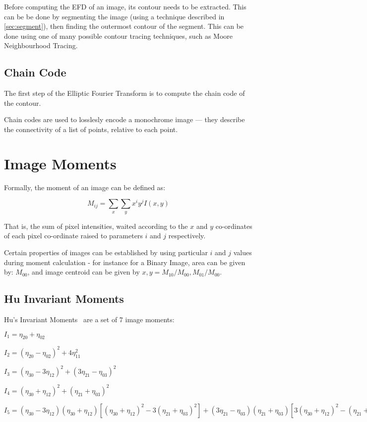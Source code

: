 Before computing the EFD of an image, its contour needs to be extracted. This can be be done by segmenting the image (using a technique described in \ref{sec:segment}), then finding the outermost contour of the segment. This can be done using one of many possible contour tracing techniques, such as Moore Neighbourhood Tracing.

\subsection{Chain Code}
The first step of the Elliptic Fourier Transform is to compute the chain code of the contour.

Chain codes are used to losslesly encode a monochrome image --- they describe the connectivity of a list of points, relative to each point.

\section{Image Moments}
Formally, the moment of an image can be defined as\cite{liao1996image}:

\begin{equation}
M_{ij} = \sum_x \sum_y x^i y^j I(x,y)\,\!
\end{equation}

That is, the sum of pixel intensities, waited according to the $x$ and $y$ co-ordinates of each pixel co-ordinate raised to parameters $i$ and $j$ respectively.

Certain properties of images can be established by using particular $i$ and $j$ values during moment calculation - for instance for a Binary Image, area can be given by: $M_{00}$, and image centroid can be given by ${x, y} = M_{10}/M_{00}, M_{01}/M_{00}$.


\subsection{Hu Invariant Moments}
\label{sec:hu}
Hu's Invariant Moments~\cite{hu1962visual} are a set of 7 image moments:

$I_1 = \eta_{20} + \eta_{02}$

$I_2 = (\eta_{20} - \eta_{02})^2 + 4\eta_{11}^2$

$I_3 = (\eta_{30} - 3\eta_{12})^2 + (3\eta_{21} - \eta_{03})^2$

$I_4 = (\eta_{30} + \eta_{12})^2 + (\eta_{21} + \eta_{03})^2$

$I_5 = (\eta_{30} - 3\eta_{12}) (\eta_{30} + \eta_{12})[ (\eta_{30} + \eta_{12})^2 - 3 (\eta_{21} + \eta_{03})^2] + (3 \eta_{21} - \eta_{03}) (\eta_{21} + \eta_{03})[ 3(\eta_{30} + \eta_{12})^2 -  (\eta_{21} + \eta_{03})^2]$

